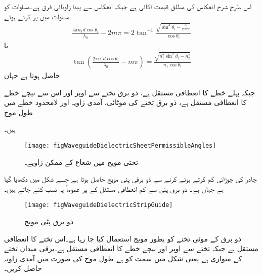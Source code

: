 اس طرح شرح انعکاس  کی مطلق قیمت اکائی ہے جبکہ انعکاس سے پیدا زاویائی فرق  ہے۔مساوات  کو مساوات  میں پر کرتے ہوئے
\begin{align}
\frac{4 \pi n_1 d \cos \theta_i}{\lambda_0}-2 m\pi=2\tan^{-1}\frac{\sqrt{\sin^2 \theta_i -\frac{\epsilon_2}{\epsilon-1}} }{\cos \theta_i}
\end{align}
یا
\begin{align}\label{مساوات_مویج_تختی_مویج_زاویہ}
\tan \left( \frac{2 \pi n_1 d \cos \theta_i}{\lambda_0}-m \pi\right)=\frac{\sqrt{n_1^2 \sin^2 \theta_i -n_2^2}}{n_1 \cos \theta_i}
\end{align}
حاصل ہوتا ہے جہاں
\begin{description}
 جبکہ
 پہلے خطے کا  انعطافی مستقل  ہے،
 ذو برق تختے سے اوپر اور اس سے نیچے خطے کا  انعطافی مستقل  ہے،
 ذو برق تختے کی موٹائی،
 آمدی زاویہ اور
 لامحدود خطے میں طول موج
\end{description}
ہیں۔
\begin{figure}
\centering
\texttt{[image: figWaveguideDielectricSheetPermissibleAngles]}
\caption{تختی مویج میں شعاع کے ممکن زاویے۔}
\label{شکل_تختی_مویج_شعاع_ممکن_زاویے}
\end{figure}

چادر کی چوڑائی کم کرتے ہوئے  کرنے سے  ذو برقی پٹی مویج حاصل ہوتا ہے جسے شکل  میں دکھایا گیا ہے جہاں  ہے۔ ذو برق پٹی سے کم  انعطافی مستقل کے  پر عموماً یہ نسب کئے جاتے ہیں۔ 


\begin{figure}
\centering
\texttt{[image: figWaveguideDielectricStripGuide]}
\caption{ذو برق پٹی مویج}
\label{شکل_مویج_ذو_برق_پٹی}
\end{figure}
ذو برق کے  موٹی تختے کو بطور مویج استعمال کیا جا رہا ہے۔اس تختے کا  انعطافی مستقل  ہے جبکہ تختے سے اوپر اور نیچے خطے کا  انعطافی مستقل  ہے۔برقی میدان تختے کے متوازی ہے یعنی شکل  میں  سمت کو ہے۔طول موج  کی صورت میں آمدی زاویہ  حاصل کریں۔

